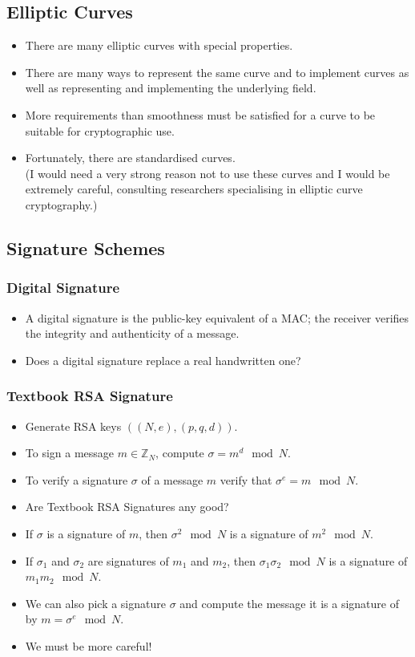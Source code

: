 \documentclass[a4paper]{scrartcl}
\begin{document}
\subsection*{Elliptic Curves}

\begin{itemize}
\item There are many elliptic curves with special properties. 
\item There are many ways to represent the same curve and to implement curves as well as representing and implementing the underlying field.
\item More requirements than smoothness must be satisfied for a curve to be suitable for cryptographic use.
\item Fortunately, there are standardised curves.\\(I would need a very strong reason not to use these curves and I would be extremely careful, consulting researchers specialising in elliptic curve cryptography.)
\end{itemize}

\subsection*{Signature Schemes}

\subsubsection*{Digital Signature}

\begin{itemize}
\item A digital signature is the public-key equivalent of a MAC; the receiver verifies the integrity and authenticity of a message.
\item Does a digital signature replace a real handwritten one?
\end{itemize}

\subsubsection{Textbook RSA Signature}

\begin{itemize}
\item Generate RSA keys $((N,e), (p,q,d))$.
\item To sign a message $m \in \mathbb{Z}_N$, compute $\sigma = m^d \mod N$.
\item To verify a signature $\sigma$ of a message $m$ verify that $\sigma^e = m \mod N$.
\item Are Textbook RSA Signatures any good?
\item If $\sigma$ is a signature of $m$, then $\sigma^2 \mod N$ is a signature of $m^2 \mod N$.
\item If $\sigma_1$ and $\sigma_2$ are signatures of $m_1$ and $m_2$, then $\sigma_1\sigma_2 \mod N$ is a signature of $m_1m_2 \mod N$.
\item We can also pick a signature $\sigma$ and compute the message it is a signature of by $m = \sigma^e \mod N$.
\item We must be more careful!
\end{itemize}
\end{document}

